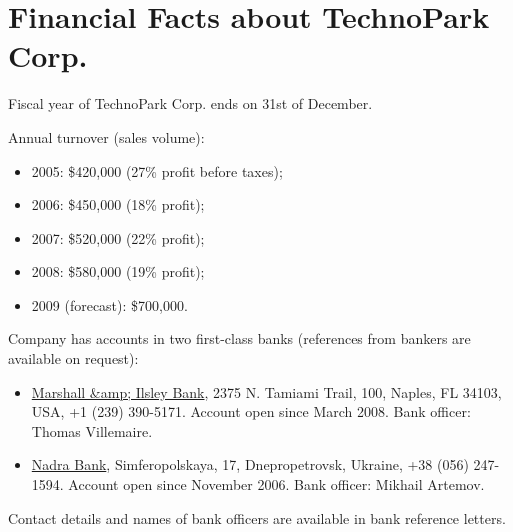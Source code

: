 
\section*{Financial Facts about TechnoPark Corp.}

Fiscal year of TechnoPark Corp. ends on 31st of December.

Annual turnover (sales volume):
\begin{itemize}
	\item 2005: \$420,000 (27\% profit before taxes);
	\item 2006: \$450,000 (18\% profit);
	\item 2007: \$520,000 (22\% profit);
	\item 2008: \$580,000 (19\% profit);
	\item 2009 (forecast): \$700,000.
\end{itemize}	

Company has accounts in two first-class banks 
(references from bankers are available on request):
\begin{itemize}
	
	\item \href{http://www.mibank.com}{Marshall &amp; Ilsley Bank}, 
	2375 N. Tamiami Trail, 100, Naples, FL 34103, USA, +1 (239) 390-5171.
	Account open since March 2008. Bank officer: Thomas Villemaire.

	\item \href{http://nadra.com.ua/eng/to-you}{Nadra Bank}, 
	Simferopolskaya, 17, Dnepropetrovsk, Ukraine, +38 (056) 247-1594.
	Account open since November 2006. Bank officer: Mikhail Artemov.

\end{itemize}	

Contact details and names of bank officers are available in 
bank reference letters.
